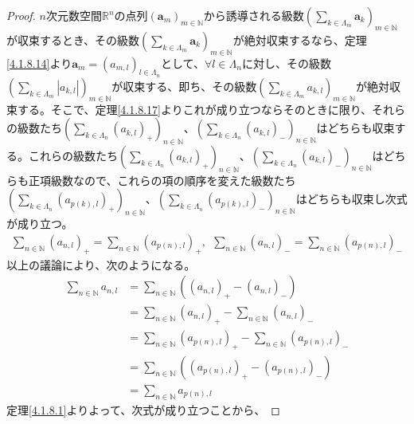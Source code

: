 \documentclass[dvipdfmx]{jsarticle}
\begin{document}
\begin{proof}
$n$次元数空間$\mathbb{R}^{n}$の点列$\left( \mathbf{a}_{m} \right)_{m \in \mathbb{N}}$から誘導される級数$\left( \sum_{k \in \varLambda_{m}} \mathbf{a}_{k} \right)_{m \in \mathbb{N}}$が収束するとき、その級数$\left( \sum_{k \in \varLambda_{m}} \mathbf{a}_{k} \right)_{m \in \mathbb{N}}$が絶対収束するなら、定理\ref{4.1.8.14}より$\mathbf{a}_{m} = \left( a_{m,l} \right)_{l \in \varLambda_{n}}$として、$\forall l \in \varLambda_{n}$に対し、その級数$\left( \sum_{k \in \varLambda_{m}} \left| a_{k,l} \right| \right)_{m \in \mathbb{N}}$が収束する、即ち、その級数$\left( \sum_{k \in \varLambda_{m}} a_{k,l} \right)_{m \in \mathbb{N}}$が絶対収束する。そこで、定理\ref{4.1.8.17}よりこれが成り立つならそのときに限り、それらの級数たち$\left( \sum_{k \in \varLambda_{n}} \left( a_{k,l} \right)_{+} \right)_{n \in \mathbb{N}}$、$\left( \sum_{k \in \varLambda_{n}} \left( a_{k,l} \right)_{-} \right)_{n \in \mathbb{N}}$はどちらも収束する。これらの級数たち$\left( \sum_{k \in \varLambda_{n}} \left( a_{k,l} \right)_{+} \right)_{n \in \mathbb{N}}$、$\left( \sum_{k \in \varLambda_{n}} \left( a_{k,l} \right)_{-} \right)_{n \in \mathbb{N}}$はどちらも正項級数なので、これらの項の順序を変えた級数たち$\left( \sum_{k \in \varLambda_{n}} \left( a_{p(k),l} \right)_{+} \right)_{n \in \mathbb{N}}$、$\left( \sum_{k \in \varLambda_{n}} \left( a_{p(k),l} \right)_{-} \right)_{n \in \mathbb{N}}$はどちらも収束し次式が成り立つ。
\begin{align*}
\sum_{n \in \mathbb{N}} \left( a_{n,l} \right)_{+} = \sum_{n \in \mathbb{N}} \left( a_{p(n),l} \right)_{+},\ \ \sum_{n \in \mathbb{N}} \left( a_{n,l} \right)_{-} = \sum_{n \in \mathbb{N}} \left( a_{p(n),l} \right)_{-}
\end{align*}
以上の議論により、次のようになる。
\begin{align*}
\sum_{n \in \mathbb{N}} a_{n,l} &= \sum_{n \in \mathbb{N}} \left( \left( a_{n,l} \right)_{+} - \left( a_{n,l} \right)_{-} \right)\\
&= \sum_{n \in \mathbb{N}} \left( a_{n,l} \right)_{+} - \sum_{n \in \mathbb{N}} \left( a_{n,l} \right)_{-}\\
&= \sum_{n \in \mathbb{N}} \left( a_{p(n),l} \right)_{+} - \sum_{n \in \mathbb{N}} \left( a_{p(n),l} \right)_{-}\\
&= \sum_{n \in \mathbb{N}} \left( \left( a_{p(n),l} \right)_{+} - \left( a_{p(n),l} \right)_{-} \right)\\
&= \sum_{n \in \mathbb{N}} a_{p(n),l}
\end{align*}
定理\ref{4.1.8.1}よりよって、次式が成り立つことから、

\end{proof}
\end{document}
